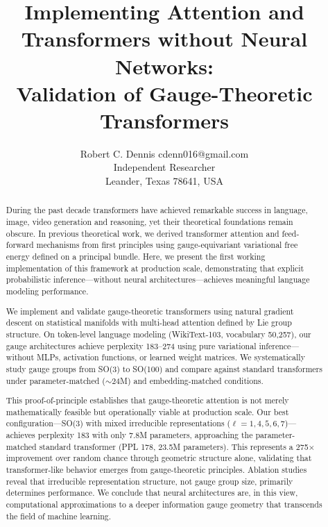\documentclass[twoside,11pt]{article}
\begin{document}

\title{Implementing Attention and Transformers without Neural Networks: \\ Validation of Gauge-Theoretic Transformers}


\author{\name Robert C. Dennis \email cdenn016@gmail.com \\
       \addr Independent Researcher\\
       \addr Leander, Texas 78641, USA}


\maketitle


\begin{abstract}
During the past decade transformers have achieved remarkable success in language, image, video generation and reasoning, yet their theoretical foundations remain obscure. In previous theoretical work, we derived transformer attention and feed-forward mechanisms from first principles using gauge-equivariant variational free energy defined on a principal bundle. Here, we present the first working implementation of this framework at production scale, demonstrating that explicit probabilistic inference---without neural architectures---achieves meaningful language modeling performance.

We implement and validate gauge-theoretic transformers using natural gradient descent on statistical manifolds with multi-head attention defined by Lie group structure. On token-level language modeling (WikiText-103, vocabulary 50,257), our gauge architectures achieve perplexity 183--274 using pure variational inference---without MLPs, activation functions, or learned weight matrices. We systematically study gauge groups from SO(3) to SO(100) and compare against standard transformers under parameter-matched ($\sim$24M) and embedding-matched conditions.

This proof-of-principle establishes that gauge-theoretic attention is not merely mathematically feasible but operationally viable at production scale. Our best configuration---SO(3) with mixed irreducible representations ($\ell=1,4,5,6,7$)---achieves perplexity 183 with only 7.8M parameters, approaching the parameter-matched standard transformer (PPL 178, 23.5M parameters). This represents a 275$\times$ improvement over random chance through geometric structure alone, validating that transformer-like behavior emerges from gauge-theoretic principles. Ablation studies reveal that irreducible representation structure, not gauge group size, primarily determines performance. We conclude that neural architectures are, in this view, computational approximations to a deeper information gauge geometry that transcends the field of machine learning.
\end{abstract}
\end{document}
